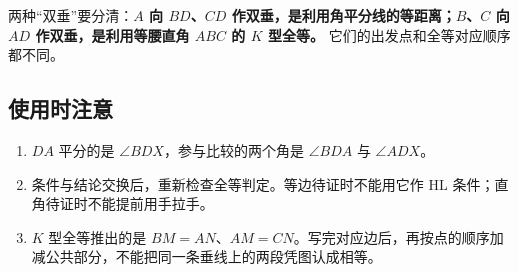 \documentclass[11pt]{article}
\theoremstyle{loomplain}
\theoremstyle{loomdefn}
\theoremstyle{loomexm}
\theoremstyle{loomrem}
\begin{document}
两种“双垂”要分清：\textbf{$A$ 向 $BD$、$CD$ 作双垂，是利用角平分线的等距离；$B$、$C$ 向 $AD$ 作双垂，是利用等腰直角 $ABC$ 的 $K$ 型全等。} 它们的出发点和全等对应顺序都不同。

\subsection{\texorpdfstring{使用时注意}{使用时注意}}

\begin{enumerate}
\item $DA$ 平分的是 $\angle BDX$，参与比较的两个角是 $\angle BDA$ 与 $\angle ADX$。
\item 条件与结论交换后，重新检查全等判定。等边待证时不能用它作 $\mathrm{HL}$ 条件；直角待证时不能提前用手拉手。
\item $K$ 型全等推出的是 $BM=AN$、$AM=CN$。写完对应边后，再按点的顺序加减公共部分，不能把同一条垂线上的两段凭图认成相等。
\end{enumerate}
\fi
\end{document}
